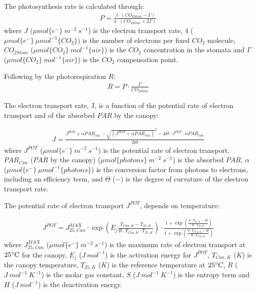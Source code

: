 \documentclass[a4paper]{article}
\numberwithin{equation}{section}
\begin{document}
The photosynthesis rate is calculated through:
\begin{align}
  P = \frac{J \cdot (CO_{2Stom} - \Gamma)}{4 \cdot (CO_{2Stom} + 2\Gamma)}
\end{align}
where \( J \) (\( \mu mol\{e^-\}\ m^{-2}\ s^{-1} \)) is the electron transport rate, \( 4 \) (\( \mu mol \{e^-\}\ \mu mol^{-1} \{CO_2\} \)) is the number of electrons per fixed \( CO_2 \) molecule, \( CO_{2Stom} \) (\( \mu mol\{CO_2\}\ mol^{-1}\{air\} \)) is the \( CO_2 \) concentration in the stomata and \( \Gamma \) (\( \mu mol \{CO_2\}\ mol^{-1} \{air\} \)) is the \( CO_2 \) compensation point.

Following by the photorespiration \( R \):
\begin{align}
  R = P \cdot \frac{\Gamma}{CO_{2Stom}}
\end{align}

The electron transport rate, J, is a function of the potential rate of electron transport and of the absorbed \( PAR \) by the canopy:

\begin{align}
  J = \frac{J^{POT} + \alpha PAR_{can} - {\sqrt{(J^{POT} + \alpha PAR_{can})}^2 - 4\Theta\cdot J^{POT}\cdot \alpha PAR_{can}}}{2 \Theta}
\end{align}
where \( J^{POT} \) (\( \mu mol\{e^-\}\ m^{-2}\ s^{-1} \)) is the potential rate of electron transport, \( PAR_{Can} \) (\( PAR \) by the canopy) (\( \mu mol\{photons\}\ m^{-2}\ s^{-1} \)) is the absorbed \( PAR \), \( \alpha \) (\( \mu mol\{e^-\}\ \mu mol^{-1}\{photons\} \)) is the conversion factor from photons to electrons, including an efficiency term, and \( \Theta \) (\( - \)) is the degree of curvature of the electron transport rate.

The potential rate of electron transport \( J^{POT} \), depends on temperature:

\begin{align}
  J^{POT} = J^{MAX}_{25,Can} \cdot \exp \left(E_j\frac{T_{Can,K}-T_{25,K}}{R\cdot T_{Can,K}\cdot T_{25,K}}\right) \cdot \frac{1 + \exp \left(\frac{S\cdot T_{25,K}-H}{R\cdot T_{25,K}}\right)}{1 + \exp \left(\frac{S\cdot T_{Can,K}-H}{R\cdot T_{Can,K}}\right)}
\end{align}
where \( J^{MAX}_{25,Can} \) (\( \mu mol \{e^-\}\ m^{-2}\ s^{-1} \)) is the maximum rate of electron transport at \( 25 \celsius \) for the canopy, \( E_j \) (\( J\ mol^{-1} \)) is the activation energy for \( J^{POT} \), \( T_{Can,K} \) (\( K \)) is the canopy temperature, \( T_{25,K} \) (\( K \)) is the reference temperature at \( 25 \celsius \), \( R \) (\( J\ mol^{-1}\ K^{-1} \)) is the molar gas constant, \( S \) (\( J\ mol^{-1}\ K^{-1} \)) is the entropy term and \( H \) (\( J\ mol^{-1} \)) is the deactivation energy.
\end{document}

